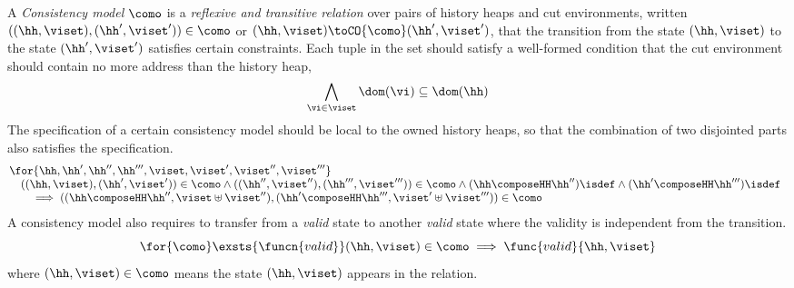\begin{defn}
\label{def:consistency-models}
A \emph{Consistency model} \( \como \) is a \emph{reflexive and transitive relation} over pairs of history heaps and cut environments, written \( ((\hh,\viset),(\hh',\viset')) \in \como \) or \( (\hh, \viset) \toCO{\como} (\hh', \viset' )\), that the transition from the state \( (\hh,\viset)\) to the state \( (\hh',\viset') \) satisfies certain constraints.
Each tuple in the set should satisfy a well-formed condition that the cut environment should contain no more address than the history heap,
\[
    \bigwedge\limits_{\vi \in \viset} \dom(\vi) \subseteq \dom(\hh)
\]
The specification of a certain consistency model should be local to the owned history heaps, so that the combination of two disjointed parts also satisfies the specification.
\[
    \begin{array}{@{}l}
    \for{\hh,\hh',\hh'',\hh''', \viset, \viset', \viset'', \viset'''} \\
        \quad ((\hh, \viset),(\hh',\viset')) \in \como 
        \land ((\hh'', \viset''),(\hh''',\viset''')) \in\como 
        \land ( \hh \composeHH \hh'' )\isdef
        \land ( \hh' \composeHH \hh''' )\isdef \\
        \qquad \implies  ((\hh \composeHH \hh'', \viset \uplus \viset''),(\hh' \composeHH \hh''',\viset' \uplus \viset''')) \in \como
    \end{array}
\]
A consistency model also requires to transfer from a \emph{valid} state to another \emph{valid} state where the validity is independent from the transition.
\[
    \for{\como} \exsts{\funcn{valid}} (\hh, \viset) \in \como \implies \func{valid}{\hh, \viset}
\]
where \( (\hh , \viset) \in \como\) means the state \((\hh, \viset)\) appears in the relation.
\end{defn}


